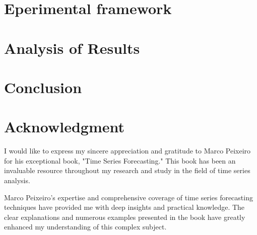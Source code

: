 \documentclass[journal]{IEEEtran}
\begin{document}
\section{Eperimental framework}\label{sec:exp}

\section{Analysis of Results}\label{sec:analysis}

\section{Conclusion}\label{sec:conclusion}

\section*{Acknowledgment}
I would like to express my sincere appreciation and gratitude to Marco
Peixeiro for his exceptional book, "Time Series Forecasting." This book has
been an invaluable resource throughout my research and study in the field of
time series analysis.

Marco Peixeiro's expertise and comprehensive coverage of time series
forecasting techniques have provided me with deep insights and practical
knowledge. The clear explanations and numerous examples presented in the book
have greatly enhanced my understanding of this complex subject.



\end{document}
